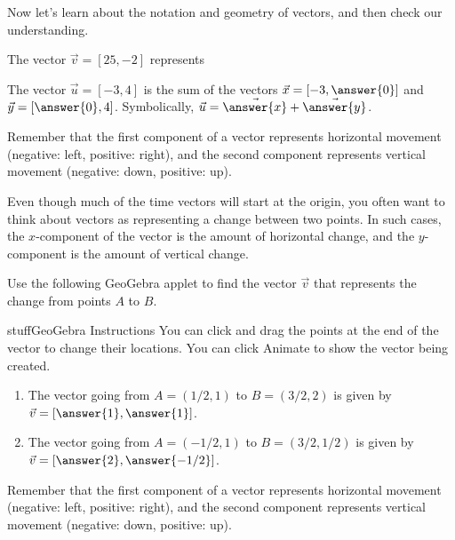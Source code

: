 \documentclass{ximera}
\begin{document}
    Now let's learn about the notation and geometry of vectors, and then check our understanding.

\begin{problem}

The vector $\vec{v}=[25, -2]$ represents \begin{multipleChoice}
\end{multipleChoice}

The vector $\vec{u}=[-3,4]$ is the sum of the vectors $\vec{x}=[-3,\answer{0}]$ and $\vec{y}=[\answer{0},4]$. Symbolically, $\vec{u}=\vec{\answer{x}}+\vec{\answer{y}}$.

\begin{feedback}
Remember that the first component of a vector represents horizontal movement (negative: left, positive: right), and the second component represents vertical movement (negative: down, positive: up).
\end{feedback}

\end{problem}

Even though much of the time vectors will start at the origin, you often want to think about vectors as representing a change between two points. In such cases, the $x$-component of the vector is the amount of horizontal change, and the $y$-component is the amount of vertical change.

\begin{problem}
    Use the following GeoGebra applet to find the vector $\vec{v}$ that represents the change from points $A$ to $B$.

    \begin{expandable}{stuff}{GeoGebra Instructions}
        You can click and drag the points at the end of the vector to change their locations. You can click Animate to show the vector being created. 
    \end{expandable}

    \begin{center}
    \end{center}

    \begin{enumerate}
        \item The vector going from $A=(1/2,1)$ to $B=(3/2,2)$ is given by $\vec{v}=[\answer{1},\answer{1}]$.
        \item The vector going from $A=(-1/2,1)$ to $B=(3/2,1/2)$ is given by $\vec{v}=[\answer{2},\answer{-1/2}]$.
    \end{enumerate}
    \begin{feedback}
        Remember that the first component of a vector represents horizontal movement (negative: left, positive: right), and the second component represents vertical movement (negative: down, positive: up).
    \end{feedback}
\end{problem}
\end{document}
